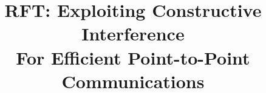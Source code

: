 \documentclass[conference]{IEEEtran}
\begin{document}
%
\title{RFT: Exploiting Constructive Interference \\For Efficient Point-to-Point Communications}


\author{}


% 
\end{document}

